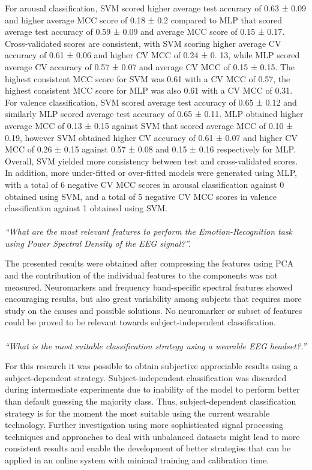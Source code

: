 For arousal classification, \ac{SVM} scored higher average test accuracy of 0.63 ± 0.09 and higher average \ac{MCC} score of 0.18 ± 0.2 compared to \ac{MLP} that scored average test accuracy of 0.59 ± 0.09 and average \ac{MCC} score of 0.15 ± 0.17. Cross-validated scores are consistent, with \ac{SVM} scoring higher average CV accuracy of 0.61 ± 0.06 and higher \ac{CV MCC} of 0.24 ± 0. 13, while \ac{MLP} scored average CV accuracy of 0.57 ± 0.07 and average \ac{CV MCC} of 0.15 ± 0.15. The highest consistent \ac{MCC} score for \ac{SVM} was 0.61 with a CV \ac{MCC} of 0.57, the highest consistent \ac{MC}C score for \ac{MLP} was also 0.61 with a \ac{CV} \ac{MCC} of 0.31. For valence classification, \ac{SVM} scored average test accuracy of 0.65 ± 0.12 and similarly \ac{MLP} scored average test accuracy of 0.65 ± 0.11. \ac{MLP} obtained higher average \ac{MCC} of 0.13 ± 0.15 against \ac{SVM} that scored average \ac{MCC} of 0.10 ± 0.19, however \ac{SVM} obtained higher CV accuracy of 0.61 ± 0.07 and higher \ac{CV} \ac{MCC} of 0.26 ± 0.15 against 0.57 ± 0.08 and 0.15 ± 0.16 respectively for \ac{MLP}. Overall, \ac{SVM} yielded more consistency between test and cross-validated scores. In addition, more under-fitted or over-fitted models were generated using \ac{MLP}, with a total of 6 negative \ac{CV MCC} scores in arousal classification against 0 obtained using \ac{SVM}, and a total of 5 negative \ac{CV MCC} scores in valence classification against 1 obtained using \ac{SVM}.
\\
\\
\emph{“What are the most relevant features to perform the Emotion-Recognition task using Power Spectral Density of the EEG signal?”.}

The presented results were obtained after compressing the features using PCA and the contribution of the individual features to the components was not measured. Neuromarkers and frequency band-specific spectral features showed encouraging results, but also great variability among subjects that requires more study on the causes and possible solutions. No neuromarker or subset of features could be proved to be relevant towards subject-independent classification.
\\
\\
\emph{“What is the most suitable classification strategy using a wearable EEG headset?.”}

For this research it was possible to obtain subjective appreciable results using a subject-dependent strategy. Subject-independent classification was discarded during intermediate experiments due to inability of the model to perform better than default guessing the majority class. Thus, subject-dependent classification strategy is for the moment the most suitable using the current wearable technology. Further investigation using more sophisticated signal processing techniques and approaches to deal with unbalanced datasets might lead to more consistent results and enable the development of better strategies that can be applied in an online system with minimal training and calibration time.




